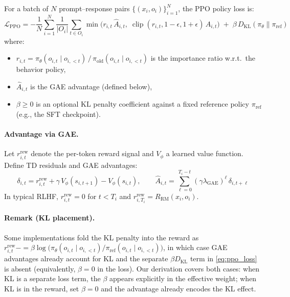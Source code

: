 \documentclass{article}
\begin{document}
For a batch of $N$ prompt--response pairs $\{(x_i, o_i)\}_{i=1}^N$, the PPO policy loss is:
\begin{equation}\label{eq:ppo_loss}
    \mathcal{L}_{\mathrm{PPO}}
    = -\frac{1}{N}\sum_{i=1}^{N}\frac{1}{|O_i|}\sum_{t\in O_i}
      \min\!\bigl(r_{i,t}\,\hat{A}_{i,t},\;
      \operatorname{clip}(r_{i,t},1{-}\epsilon,1{+}\epsilon)\,\hat{A}_{i,t}\bigr)
      \;+\;\beta\,D_{\mathrm{KL}}(\pi_\theta\|\pi_{\mathrm{ref}})
\end{equation}
where:
\begin{itemize}
    \item $r_{i,t} = \pi_\theta(o_{i,t}\mid o_{i,<t})\,/\,\pi_{\mathrm{old}}(o_{i,t}\mid o_{i,<t})$ is the importance ratio w.r.t.\ the behavior policy,
    \item $\hat{A}_{i,t}$ is the GAE advantage (defined below),
    \item $\beta\ge0$ is an optional KL penalty coefficient against a fixed reference policy $\pi_{\mathrm{ref}}$ (e.g., the SFT checkpoint).
\end{itemize}

\paragraph{Advantage via GAE.}
Let $r_{i,t}^{\mathrm{rew}}$ denote the per-token reward signal and $V_\phi$ a learned value function.
Define TD residuals and GAE advantages:
\begin{equation}\label{eq:gae}
    \delta_{i,t} = r_{i,t}^{\mathrm{rew}} + \gamma\,V_\phi(s_{i,t+1}) - V_\phi(s_{i,t}),
    \qquad
    \hat{A}_{i,t} = \sum_{\ell=0}^{T_i - t}(\gamma\lambda_{\mathrm{GAE}})^\ell\,\delta_{i,t+\ell}
\end{equation}
In typical RLHF, $r_{i,t}^{\mathrm{rew}}=0$ for $t<T_i$ and $r_{i,T_i}^{\mathrm{rew}} = R_{\mathrm{RM}}(x_i,o_i)$.

\paragraph{Remark (KL placement).}
Some implementations fold the KL penalty into the reward as $r_{i,t}^{\mathrm{rew}} \mathrel{{-}{=}} \beta\log\bigl(\pi_\theta(o_{i,t}\mid o_{i,<t})/\pi_{\mathrm{ref}}(o_{i,t}\mid o_{i,<t})\bigr)$, in which case GAE advantages already account for KL and the separate $\beta D_{\mathrm{KL}}$ term in \eqref{eq:ppo_loss} is absent (equivalently, $\beta=0$ in the loss).
Our derivation covers both cases: when KL is a separate loss term, the $\beta$ appears explicitly in the effective weight; when KL is in the reward, set $\beta=0$ and the advantage already encodes the KL effect.
\end{document}
